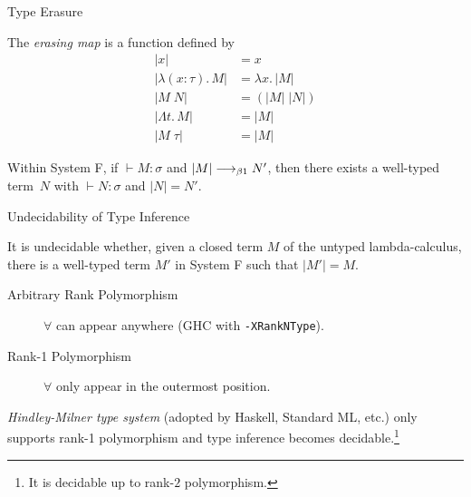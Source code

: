 \begin{frame}{Type Erasure}
\begin{definition}
  The \emph{erasing map} is a function defined by
  \begin{align*}
    |x| & = x \\
    |\lambda (x : \tau).\,M| & = \lambda x.\, |M| \\
    |M\;N| & = (|M|\;|N|) \\
    |\Lambda t.\, M| & = |M| \\
    |M\;\tau| & = |M|
  \end{align*}
\end{definition}

\begin{proposition}
  Within System F, if ${}\vdash M : \sigma$ and $|M|
  \longrightarrow_{\beta1} N'$, then there exists a well-typed term~$N$ with
  ${}\vdash N : \sigma$ and $|N| = N'$.
\end{proposition}
\end{frame}


\begin{frame}{Undecidability of Type Inference}
  \begin{theorem}
     It is undecidable whether, given a closed term $M$ of the untyped
     lambda-calculus, there is a well-typed term $M'$ in System F such that
     $|M'| = M$.  
  \end{theorem}

  \begin{description}
    \item[Arbitrary Rank Polymorphism] $\forall$ can appear
      anywhere {\small (GHC with \texttt{-XRankNType})}. 
    \item[Rank-1 Polymorphism]
      $\forall$ only appear in the outermost position.
  \end{description}
  \emph{Hindley-Milner type system} (adopted by Haskell, Standard ML, etc.) only
  supports rank-1 polymorphism and type inference becomes
  decidable.\footnote{It is decidable up to rank-$2$ polymorphism.}
\end{frame}

